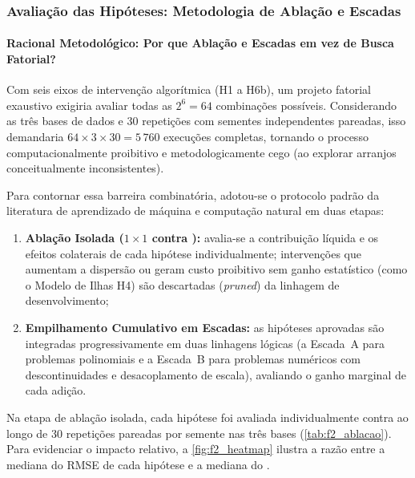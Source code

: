 \newpage

\subsubsection{Avaliação das Hipóteses: Metodologia de Ablação e Escadas}
\label{sec:f2_ablacao}

\paragraph{Racional Metodológico: Por que Ablação e Escadas em vez de Busca Fatorial?}
Com seis eixos de intervenção algorítmica (H1 a H6b), um projeto fatorial exaustivo
exigiria avaliar todas as $2^6 = 64$ combinações possíveis. Considerando as três
bases de dados e 30 repetições com sementes independentes pareadas, isso
demandaria $64 \times 3 \times 30 = 5\,760$ execuções completas, tornando o processo
computacionalmente proibitivo e metodologicamente cego (ao explorar arranjos
conceitualmente inconsistentes).

Para contornar essa barreira combinatória, adotou-se o protocolo padrão da
literatura de aprendizado de máquina e computação natural em duas etapas:
\begin{enumerate}
  \item \textbf{Ablação Isolada ($1 \times 1$ contra ):} avalia-se a
        contribuição líquida e os efeitos colaterais de cada hipótese individualmente;
        intervenções que aumentam a dispersão ou geram custo proibitivo sem ganho
        estatístico (como o Modelo de Ilhas H4) são descartadas (\emph{pruned}) da
        linhagem de desenvolvimento;
  \item \textbf{Empilhamento Cumulativo em Escadas:} as hipóteses aprovadas são
        integradas progressivamente em duas linhagens lógicas (a Escada~A para problemas
        polinomiais e a Escada~B para problemas numéricos com descontinuidades e
        desacoplamento de escala), avaliando o ganho marginal de cada adição.
\end{enumerate}

Na etapa de ablação isolada, cada hipótese foi avaliada individualmente contra
 ao longo de 30 repetições pareadas por semente nas três bases
(\cref{tab:f2_ablacao}). Para evidenciar o impacto relativo, a \cref{fig:f2_heatmap}
ilustra a razão entre a mediana do RMSE de cada hipótese e a mediana do .

